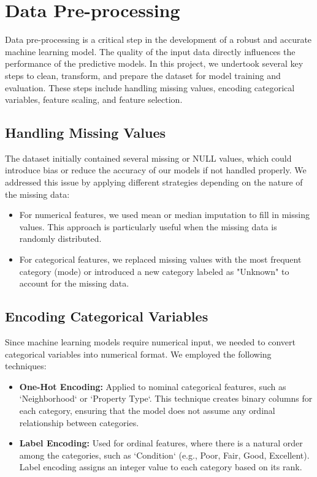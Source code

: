 \documentclass[10pt,conference,compsoc]{IEEEtran}
\begin{document}
{\section{Data Pre-processing}
Data pre-processing is a critical step in the development of a robust and accurate machine learning model. The quality of the input data directly influences the performance of the predictive models. In this project, we undertook several key steps to clean, transform, and prepare the dataset for model training and evaluation. These steps include handling missing values, encoding categorical variables, feature scaling, and feature selection.

\subsection{Handling Missing Values}
The dataset initially contained several missing or NULL values, which could introduce bias or reduce the accuracy of our models if not handled properly. We addressed this issue by applying different strategies depending on the nature of the missing data:
\begin{itemize}
    \item For numerical features, we used mean or median imputation to fill in missing values. This approach is particularly useful when the missing data is randomly distributed.
    \item For categorical features, we replaced missing values with the most frequent category (mode) or introduced a new category labeled as "Unknown" to account for the missing data.
\end{itemize}

\subsection{Encoding Categorical Variables}
Since machine learning models require numerical input, we needed to convert categorical variables into numerical format. We employed the following techniques:
\begin{itemize}
    \item \textbf{One-Hot Encoding:} Applied to nominal categorical features, such as `Neighborhood` or `Property Type`. This technique creates binary columns for each category, ensuring that the model does not assume any ordinal relationship between categories.
    \item \textbf{Label Encoding:} Used for ordinal features, where there is a natural order among the categories, such as `Condition` (e.g., Poor, Fair, Good, Excellent). Label encoding assigns an integer value to each category based on its rank.
\end{itemize}

}
\end{document}
